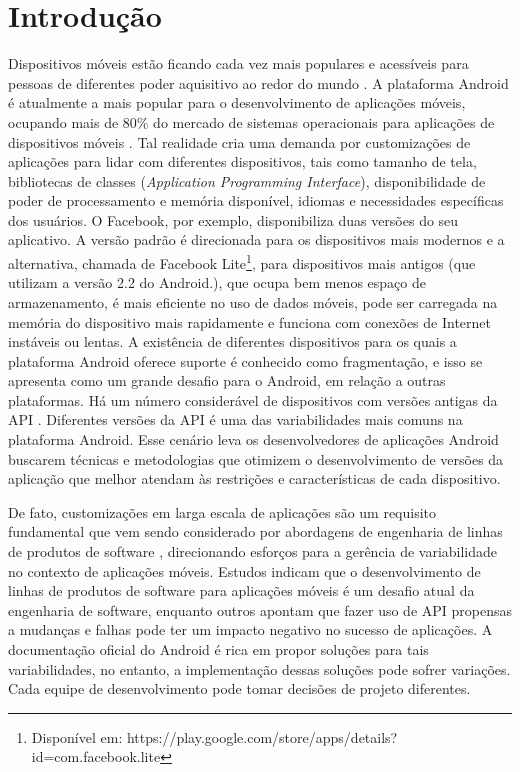 \chapter{Introdução} \label{ch:introducao}

Dispositivos móveis estão ficando cada vez mais populares e acessíveis para pessoas
de diferentes poder aquisitivo ao redor do mundo \cite{Lhamas2014}. A plataforma
Android é atualmente a mais popular para o desenvolvimento de aplicações móveis,
ocupando mais de 80\% do mercado de sistemas operacionais para aplicações de
dispositivos móveis \cite{jim2014}. Tal realidade cria uma demanda por customizações
de aplicações para lidar com diferentes dispositivos, tais como tamanho de tela,
bibliotecas de classes (\textit{Application Programming Interface}), disponibilidade de poder de
processamento e memória disponível, idiomas e necessidades específicas dos usuários.
O Facebook, por exemplo, disponibiliza duas versões do seu aplicativo. A versão
padrão é direcionada para os dispositivos mais modernos e a alternativa, chamada
de Facebook Lite\footnote{Disponível em: https://play.google.com/store/apps/details?id=com.facebook.lite},
para dispositivos mais antigos (que utilizam a versão 2.2 do Android.), que ocupa
bem menos espaço de armazenamento, é mais eficiente no uso de dados móveis, pode
ser carregada na memória do dispositivo mais rapidamente e funciona com conexões
de Internet instáveis ou lentas. A existência de diferentes dispositivos para os
quais a plataforma Android oferece suporte é conhecido como fragmentação, e isso
se apresenta como um grande desafio para o Android, em relação a outras plataformas.
Há um número considerável de dispositivos com versões antigas da API \cite{Gronli2014}.
Diferentes versões da API é uma das variabilidades mais comuns na plataforma Android.
Esse cenário leva os desenvolvedores de aplicações Android buscarem técnicas e
metodologias que otimizem o desenvolvimento de versões da aplicação que melhor
atendam às restrições e características de cada dispositivo.

De fato, customizações em larga escala de aplicações são um requisito fundamental
que vem sendo considerado por abordagens de engenharia de linhas de produtos de
software  \cite{Alves2007} \cite{Alves2005}, direcionando esforços para a
gerência de variabilidade no contexto de aplicações móveis. Estudos \cite{Dehlinger2011}
indicam que o desenvolvimento de linhas de produtos de software para aplicações
móveis é um desafio atual da engenharia de software, enquanto outros
\cite{Linares-Vasquez2013} apontam que fazer uso de API propensas a mudanças e
falhas pode ter um impacto negativo no sucesso de aplicações. A documentação oficial
do Android \cite{GuiaAndroid} é rica em propor soluções para tais variabilidades,
no entanto, a implementação dessas soluções pode sofrer variações. Cada equipe
de desenvolvimento pode tomar decisões de projeto diferentes.

